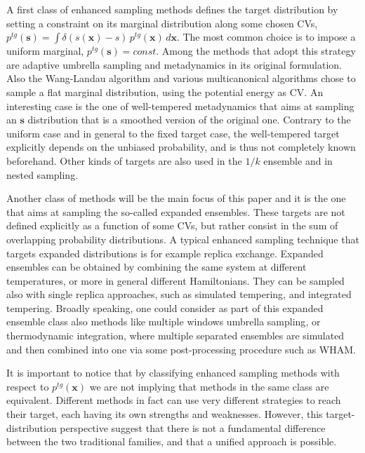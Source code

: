 \documentclass[aps,prx,reprint,superscriptaddress]{revtex4-1} %
\begin{document}
A first class of enhanced sampling methods defines the target distribution by setting a constraint on its marginal distribution along some chosen CVs, $p^{tg}(\mathbf{s})=\int \delta (s(\mathbf{x})-s)\,  p^{tg}(\mathbf{x})\, d\mathbf{x}$.
The most common choice is to impose a uniform marginal, $p^{tg}(\mathbf{s})=const$.
Among the methods that adopt this strategy are adaptive umbrella sampling\cite{Mezei1987} and  metadynamics in its original formulation\cite{Laio2002}. 
Also the Wang-Landau algorithm\cite{Wang2001} and various multicanonical algorithms\cite{Berg1991,Lee1993} chose to sample a flat marginal distribution, using the potential energy as CV.
An interesting case is the one of well-tempered metadynamics\cite{Barducci2008} that aims at sampling an $\mathbf{s}$ distribution that is a smoothed version of the original one.
Contrary to the uniform case and in general to the fixed target case\cite{White2015}, the well-tempered target explicitly depends on the unbiased probability, and is thus not completely known beforehand.
Other kinds of targets are also used in the $1/k$ ensemble\cite{Hesselbo1995} and in nested sampling\cite{Partay2010}.

Another class of methods will be the main focus of this paper and it is the one that aims at sampling the so-called expanded ensembles\cite{Lyubartsev1992}.
These targets are not defined explicitly as a function of some CVs, but rather consist in the sum of overlapping probability distributions.
A typical enhanced sampling technique that targets expanded distributions is for example replica exchange\cite{Sugita1999}.
Expanded ensembles can be obtained by combining the same system at different temperatures, or more in general different Hamiltonians\cite{Sugita2000,Liu2005,Bussi2014}.
They can be sampled also with single replica approaches, such as simulated tempering\cite{Marinari1992}, and integrated tempering\cite{Gao2008,Nymeyer2010}.
Broadly speaking, one could consider as part of this expanded ensemble class also methods like multiple windows umbrella sampling\cite{Kastner2011}, or thermodynamic integration\cite{Vega2008}, where multiple separated ensembles are simulated and then combined into one via some post-processing procedure such as WHAM\cite{Kumar1992}.

It is important to notice that by classifying enhanced sampling methods with respect to $p^{tg}(\mathbf{x})$ we are not implying that methods in the same class are equivalent.
Different methods in fact can use very different strategies to reach their target, each having its own strengths and weaknesses.
However, this target-distribution perspective suggest that there is not a fundamental difference between the two traditional families, and that a unified approach is possible.
\end{document}
